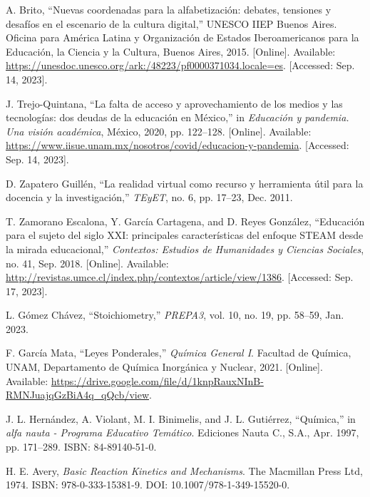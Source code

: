 \documentclass[conference]{IEEEtran}
\begin{document}
\begin{thebibliography}{9}

A. Brito, ``Nuevas coordenadas para la alfabetización: debates, tensiones y desafíos en el escenario de la cultura digital,'' UNESCO IIEP Buenos Aires. Oficina para América Latina y Organización de Estados Iberoamericanos para la Educación, la Ciencia y la Cultura, Buenos Aires, 2015. [Online]. Available: \url{https://unesdoc.unesco.org/ark:/48223/pf0000371034.locale=es}. [Accessed: Sep. 14, 2023].

J. Trejo-Quintana, ``La falta de acceso y aprovechamiento de los medios y las tecnologías: dos deudas de la educación en México,'' in \textit{Educación y pandemia. Una visión académica}, México, 2020, pp. 122–128. [Online]. Available: \url{https://www.iisue.unam.mx/nosotros/covid/educacion-y-pandemia}. [Accessed: Sep. 14, 2023].

D. Zapatero Guillén, ``La realidad virtual como recurso y herramienta útil para la docencia y la investigación,'' \textit{TEyET}, no. 6, pp. 17–23, Dec. 2011.

T. Zamorano Escalona, Y. García Cartagena, and D. Reyes González, ``Educación para el sujeto del siglo XXI: principales características del enfoque STEAM desde la mirada educacional,'' \textit{Contextos: Estudios de Humanidades y Ciencias Sociales}, no. 41, Sep. 2018. [Online]. Available: \url{http://revistas.umce.cl/index.php/contextos/article/view/1386}. [Accessed: Sep. 17, 2023].

L. Gómez Chávez, “Stoichiometry,” \textit{PREPA3}, vol. 10, no. 19, pp. 58–59, Jan. 2023.

F. García Mata, “Leyes Ponderales,” \textit{Química General I}. Facultad de Química, UNAM, Departamento de Química Inorgánica y Nuclear, 2021. [Online]. Available: \url{https://drive.google.com/file/d/1knpRauxNInB-RMNJuajqGzBiA4q_qQcb/view}.

J. L. Hernández, A. Violant, M. I. Binimelis, and J. L. Gutiérrez, “Química,” in \textit{alfa nauta - Programa Educativo Temático}. Ediciones Nauta C., S.A., Apr. 1997, pp. 171–289. ISBN: 84-89140-51-0.

H. E. Avery, \textit{Basic Reaction Kinetics and Mechanisms}. The Macmillan Press Ltd, 1974. ISBN: 978-0-333-15381-9. DOI: 10.1007/978-1-349-15520-0.
\end{thebibliography}
\end{document}
